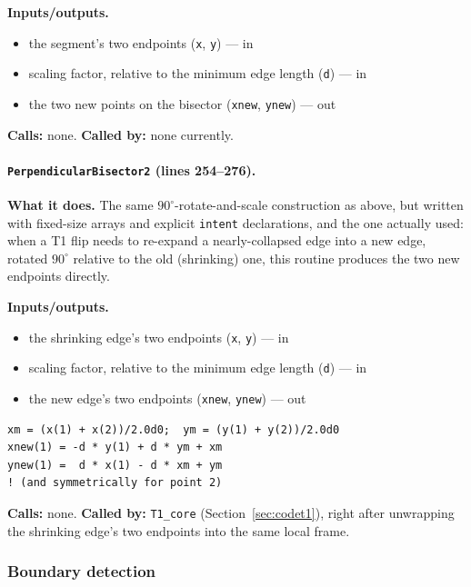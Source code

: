 \documentclass[11pt]{article}
\begin{document}
\textbf{Inputs/outputs.}
\begin{itemize}[nosep]
  \item the segment's two endpoints (\texttt{x}, \texttt{y}) --- in
  \item scaling factor, relative to the minimum edge length (\texttt{d}) --- in
  \item the two new points on the bisector (\texttt{xnew}, \texttt{ynew}) --- out
\end{itemize}

\textbf{Calls:} none. \textbf{Called by:} none currently.

\paragraph{\texttt{PerpendicularBisector2} (lines 254--276).}
\textbf{What it does.} The same $90^\circ$-rotate-and-scale construction as above, but
written with fixed-size arrays and explicit \texttt{intent} declarations, and the one
actually used: when a T1 flip needs to re-expand a nearly-collapsed edge into a new
edge, rotated $90^\circ$ relative to the old (shrinking) one, this routine produces the
two new endpoints directly.

\textbf{Inputs/outputs.}
\begin{itemize}[nosep]
  \item the shrinking edge's two endpoints (\texttt{x}, \texttt{y}) --- in
  \item scaling factor, relative to the minimum edge length (\texttt{d}) --- in
  \item the new edge's two endpoints (\texttt{xnew}, \texttt{ynew}) --- out
\end{itemize}

\begin{lstlisting}[caption={The 90-degree rotation-about-midpoint used by \texttt{PerpendicularBisector2}.}]
xm = (x(1) + x(2))/2.0d0;  ym = (y(1) + y(2))/2.0d0
xnew(1) = -d * y(1) + d * ym + xm
ynew(1) =  d * x(1) - d * xm + ym
! (and symmetrically for point 2)
\end{lstlisting}

\textbf{Calls:} none. \textbf{Called by:} \texttt{T1\_core} (Section~\ref{sec:codet1}),
right after unwrapping the shrinking edge's two endpoints into the same local frame.

\subsubsection*{Boundary detection}
\end{document}
